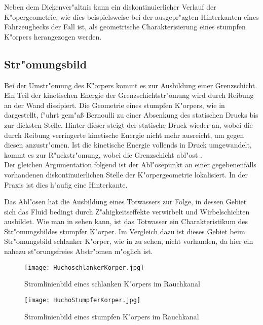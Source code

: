 Neben dem Dickenver"altnis kann ein diskontinuierlicher Verlauf der K"opergeometrie, wie dies beispielsweise bei  der ausgepr"agten Hinterkanten eines Fahrzeughecks der Fall ist, als geometrische Charakterisierung eines stumpfen K"orpers herangezogen werden. 

\subsection{Str"omungsbild}
\label{sec:Stromungsbild}
Bei der Umstr"omung des K"orpers kommt es zur Ausbildung einer Grenzschicht. Ein Teil der kinetischen Energie der Grenzschichtstr"omung wird durch Reibung an der Wand dissipiert. Die Geometrie eines stumpfen K"orpers, wie in  dargestellt, f"uhrt gem"a\ss{} Bernoulli zu einer Absenkung des statischen Drucks bis zur dicksten Stelle. Hinter dieser steigt der statische Druck wieder an, wobei die durch Reibung verringerte kinetische Energie nicht mehr ausreicht, um gegen diesen anzustr"omen. Ist die kinetische Energie vollends in Druck umgewandelt, kommt es zur R"uckstr"omung, wobei die Grenzschicht abl"ost \cite{Hucho.2011}.\\
Der gleichen Argumentation folgend ist der Abl"osepunkt an einer gegebenenfalls vorhandenen diskontinuierlichen Stelle der K"orpergeometrie lokalisiert. In der Praxis ist dies h"aufig eine Hinterkante. 

Das Abl"osen hat die Ausbildung eines Totwassers zur Folge, in dessen Gebiet sich das Fluid bedingt durch Z"ahigkeitseffekte verwirbelt und Wirbelschichten ausbildet. Wie man in  sehen kann, ist das Totwasser ein Charakteristikum des Str"omungsbildes stumpfer K"orper. Im Vergleich dazu ist dieses Gebiet beim Str"omungsbild schlanker K"orper, wie in  zu sehen, nicht vorhanden, da hier ein nahezu st"orungsfreies Abstr"omen m"oglich ist.

\begin{figure}[h]
	\centering
	\texttt{[image: HuchoschlankerKorper.jpg]}
	\caption{Stromlinienbild eines schlanken K"orpers im Rauchkanal \cite{Hucho.2011}}
	\label{fig:HuchoSchlank}
\end{figure}

\begin{figure}[h]
	\centering
	\texttt{[image: HuchoStumpferKorper.jpg]}
	\caption{Stromlinienbild eines stumpfen K"orpers im Rauchkanal \cite{Hucho.2011}}
	\label{fig:HuchoStumpf}
\end{figure}

